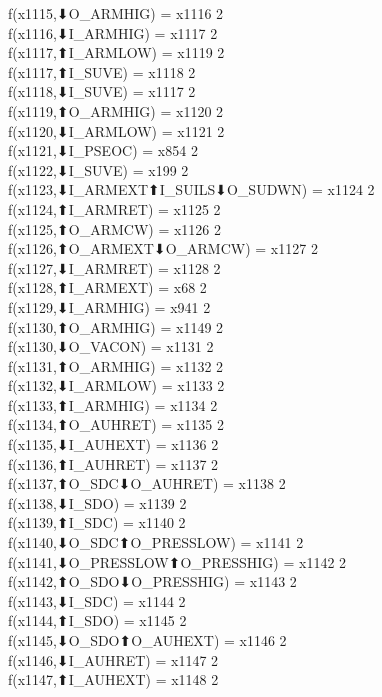 f(x1115,⬇O_ARMHIG) = x1116 {2} \\
f(x1116,⬇I_ARMHIG) = x1117 {2} \\
f(x1117,⬆I_ARMLOW) = x1119 {2} \\
f(x1117,⬆I_SUVE) = x1118 {2} \\
f(x1118,⬇I_SUVE) = x1117 {2} \\
f(x1119,⬆O_ARMHIG) = x1120 {2} \\
f(x1120,⬇I_ARMLOW) = x1121 {2} \\
f(x1121,⬇I_PSEOC) = x854 {2} \\
f(x1122,⬇I_SUVE) = x199 {2} \\
f(x1123,⬇I_ARMEXT⬆I_SUILS⬇O_SUDWN) = x1124 {2} \\
f(x1124,⬆I_ARMRET) = x1125 {2} \\
f(x1125,⬆O_ARMCW) = x1126 {2} \\
f(x1126,⬆O_ARMEXT⬇O_ARMCW) = x1127 {2} \\
f(x1127,⬇I_ARMRET) = x1128 {2} \\
f(x1128,⬆I_ARMEXT) = x68 {2} \\
f(x1129,⬇I_ARMHIG) = x941 {2} \\
f(x1130,⬆O_ARMHIG) = x1149 {2} \\
f(x1130,⬇O_VACON) = x1131 {2} \\
f(x1131,⬆O_ARMHIG) = x1132 {2} \\
f(x1132,⬇I_ARMLOW) = x1133 {2} \\
f(x1133,⬆I_ARMHIG) = x1134 {2} \\
f(x1134,⬆O_AUHRET) = x1135 {2} \\
f(x1135,⬇I_AUHEXT) = x1136 {2} \\
f(x1136,⬆I_AUHRET) = x1137 {2} \\
f(x1137,⬆O_SDC⬇O_AUHRET) = x1138 {2} \\
f(x1138,⬇I_SDO) = x1139 {2} \\
f(x1139,⬆I_SDC) = x1140 {2} \\
f(x1140,⬇O_SDC⬆O_PRESSLOW) = x1141 {2} \\
f(x1141,⬇O_PRESSLOW⬆O_PRESSHIG) = x1142 {2} \\
f(x1142,⬆O_SDO⬇O_PRESSHIG) = x1143 {2} \\
f(x1143,⬇I_SDC) = x1144 {2} \\
f(x1144,⬆I_SDO) = x1145 {2} \\
f(x1145,⬇O_SDO⬆O_AUHEXT) = x1146 {2} \\
f(x1146,⬇I_AUHRET) = x1147 {2} \\
f(x1147,⬆I_AUHEXT) = x1148 {2} \\
